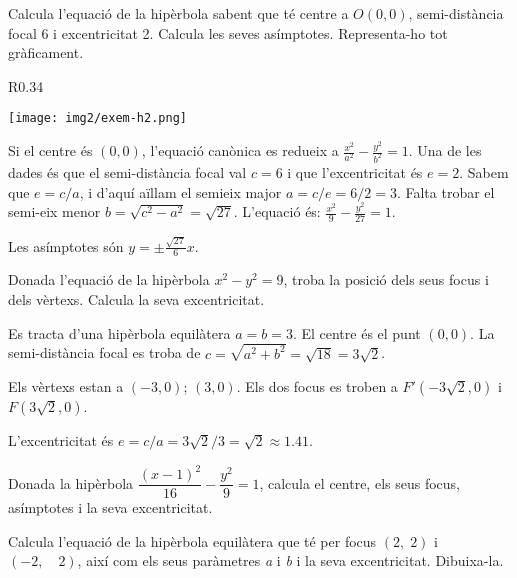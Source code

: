 \documentclass[11pt, a4paper, pdf]{article}
\begin{document}
\begin{resolt}[E]{Calcula l'equació de la hipèrbola sabent que té centre a $O(0,0)$, semi-distància focal 6 i excentricitat 2. Calcula les seves asímptotes. Representa-ho tot gràficament.}
	\begin{wrapfigure}{R}{0.34\textwidth} 
		\vspace{-0.5cm}
		\begin{center}
			\texttt{[image: img2/exem-h2.png]}
		\end{center}
	\end{wrapfigure}
	
	Si el centre és $(0,0)$, l'equació canònica es redueix a \linebreak $\frac{x^2}{a^2}-\frac{y^2}{b^2}=1$. Una de les dades és que el semi-distància focal val $c=6$ i que l'excentricitat és $e=2$. Sabem que $e=c/a$, i d'aquí aïllam el semieix major  $a=c/e=6/2=3$. Falta trobar el semi-eix menor $b=\sqrt{c^2-a^2}=\sqrt{27}$. L'equació és: $\frac{x^2}{9}-\frac{y^2}{27}=1$.
	
	Les asímptotes són $y=\pm \frac{\sqrt{27}}{6}x$.
\end{resolt}
\begin{resolt}{ Donada l'equació de la hipèrbola  $x^2-y^2=9$, troba la posició dels seus focus i dels vèrtexs. Calcula la seva excentricitat. }
	
	Es tracta d'una hipèrbola equilàtera $a=b=3$. El centre és el punt $(0,0)$. La semi-distància focal es troba de $c=\sqrt{a^2+b^2}=\sqrt{18}=3\sqrt{2}$. 
	
	Els vèrtexs estan a $(-3,0)$; $(3,0)$. Els dos focus es troben a $F'(-3\sqrt{2},0)$ i $F(3\sqrt{2},0)$.  
	
	L'excentricitat és $e=c/a = 3\sqrt{2}/3 = \sqrt{2}\approx 1.41$.
\end{resolt}

\begin{mylist}
	\item Donada la hipèrbola $\dfrac{\left(x-1\right)^{2}}{16} -\dfrac{{y}^{2}}{9} =1$, calcula el centre, els seus focus, asímptotes i la seva excentricitat.
	
	
	\item  Calcula l'equació de la hipèrbola equilàtera que té per focus $\left(2,\; 2\right)$ i $\left(-2,\quad 2\right)$, així com els seus paràmetres \textit{a}  i  \textit{b} i la seva excentricitat. Dibuixa-la.
	
\end{mylist}
\end{document}
